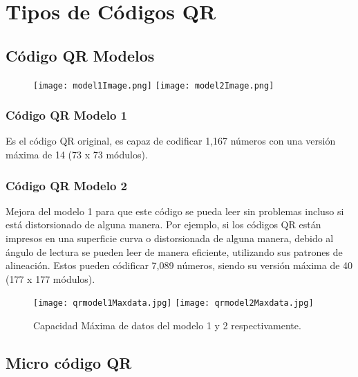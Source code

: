 \section{Tipos de Códigos QR}

\subsection{Código QR Modelos}
\begin{figure} 
	\texttt{[image: model1Image.png]}
	\texttt{[image: model2Image.png]}
	\label{fig:QRModels}
\end{figure}

\subsubsection{Código QR Modelo 1}
Es el código QR original, es capaz de codificar 1,167 números con una versión máxima de 14 (73 x 73 módulos). \cite{qrcode2021}

\subsubsection{Código QR Modelo 2}
Mejora del modelo 1 para que este código se pueda leer sin problemas incluso si está distorsionado de alguna manera. Por ejemplo, si los códigos QR están impresos en una superficie curva o distorsionada de alguna manera, debido al ángulo de lectura se pueden leer de manera eficiente, utilizando sus patrones de alineación. Estos pueden códificar 7,089 números, siendo su versión máxima de 40 (177 x 177 módulos).\cite{qrcode2021}

\begin{figure} 
	\centering
	\texttt{[image: qrmodel1Maxdata.jpg]}
	\texttt{[image: qrmodel2Maxdata.jpg]}
	\caption{Capacidad Máxima de datos del modelo 1 y 2 respectivamente.}
	\label{fig:qrmodel2Maxdata}
\end{figure} 

\subsection{Micro código QR}

